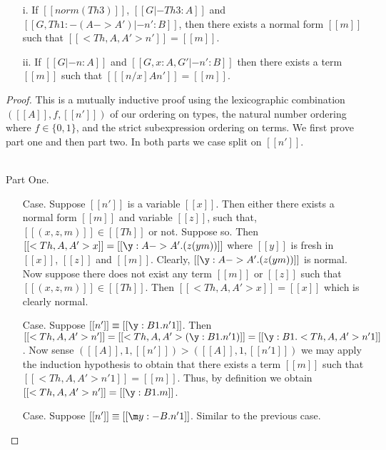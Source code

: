 \begin{lemma}
  \label{lemma:normality_preservation}
  \begin{itemize}
  \item[i.] If $[[norm (Th 3)]]$, $[[G |- Th 3 : A]]$ and $[[G, Th 1:{-(A->A')} |- n' : B]]$, 
    then there exists a normal form $[[m]]$ such that $[[<Th,A,A'>n']] = [[m]]$.
    
  \item[ii.] If $[[G |- n:A]]$ and $[[G, x:A, G' |- n':B]]$ then there exists a term $[[m]]$ 
    such that $[[ [n/x] A n']] = [[m]]$. 
  \end{itemize} 
\end{lemma}
\begin{proof}
  This is a mutually inductive proof using the lexicographic combination
  $([[A]], f,[[n']])$ of our ordering on types,
  the natural number ordering where $f \in \{0,1\}$, and
  the strict subexpression ordering on terms. We first prove part one
  and then part two.  In both parts we case split on $[[n']]$.

  \ \\
  \noindent Part One.
  \begin{itemize}
  \item[Case.] Suppose $[[n']]$ is a variable $[[x]]$.  Then either there exists
    a normal form $[[m]]$ and variable $[[z]]$, such that, $[[(x,z,m)]] \in [[Th]]$ or not.  
    Suppose so. Then 
    $[[<Th,A,A'>x]] = [[\y:A->A'.(z (y m))]]$ where $[[y]]$ is fresh in $[[x]]$, $[[z]]$ and 
    $[[m]]$.  Clearly, $[[\y:A->A'.(z (y m))]]$ is normal.
    Now suppose there does not exist any term $[[m]]$ or $[[z]]$ such that 
    $[[(x,z,m)]] \in [[Th]]$.  Then $[[<Th,A,A'>x]] = [[x]]$ which is clearly normal.

  \item[Case.] Suppose $[[n']] \equiv [[\y:B1.n'1]]$.  Then 
    $[[<Th,A,A'>n']] = [[<Th ,A,A'>(\y:B1.n'1)]] = [[\y:B1.<Th,A,A'>n'1]]$.  Now sense
    $([[A]],1,[[n']]) > ([[A]],1,[[n'1]])$ we may apply the induction hypothesis to obtain
    that there exists a term $[[m]]$ such that $[[<Th,A,A'>n'1]] = [[m]]$.  
    Thus, by definition we obtain $[[<Th,A,A'>n']] = [[\y:B1.m]]$.

  \item[Case.] Suppose $[[n']] \equiv [[\m y:{-B}.n'1]]$. Similar to the previous case.


\end{itemize}
\end{proof}
